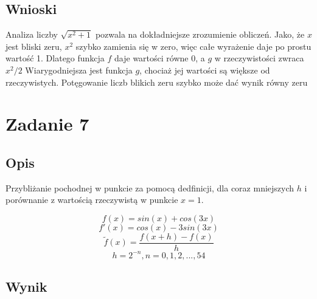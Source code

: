 \documentclass[12pt, letterpaper]{article}
\begin{document}
\begin{center}
\begin{tabular}{|c | c | c | c |}
    \end{tabular}
\end{center}

\subsection{Wnioski}

Analiza liczby $\sqrt{x^2 + 1}$ pozwala na dokładniejsze zrozumienie obliczeń.
Jako, że $x$ jest bliski zeru, $x^2$ szybko zamienia się w zero, więc całe
wyrażenie daje po prostu wartość 1.
Dlatego funkcja $f$ daje wartości równe 0, a $g$ w rzeczywistości zwraca $x^2 /
    2$
Wiarygodniejsza jest funkcja $g$, chociaż jej wartości są większe od
rzeczywistych. Potęgowanie liczb blikich zeru szybko może dać wynik równy zeru

\section{Zadanie 7}

\subsection{Opis}

Przybliżanie pochodnej w punkcie za pomocą dedfinicji, dla coraz mniejszych $h$
i porównanie z wartością rzeczywistą w punkcie $x = 1$.

\[ f(x) = sin(x) + cos(3 x) \]
\[ f'(x) = cos(x) - 3 sin(3 x) \]
\[ \widetilde{f} (x) = \frac{f(x + h) - f(x)}{h} \]
\[ h = 2^{-n}, n = 0, 1, 2,...,54 \]

\subsection{Wynik}
\end{document}
